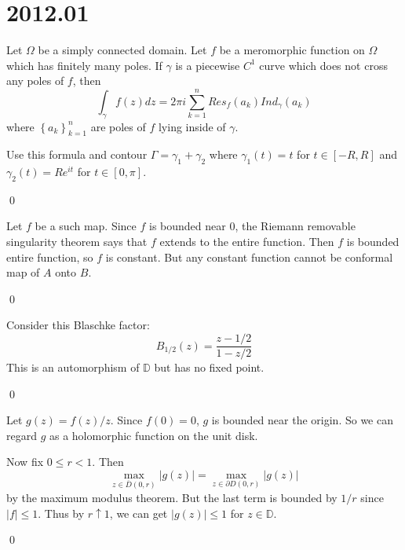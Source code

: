 \section{2012.01}

\begin{problem}
	
	Let $\Omega$ be a simply connected domain. Let $f$ be a meromorphic function on $\Omega$ which has finitely many poles.
	If $\gamma$ is a piecewise $C^1$ curve which does not cross any poles of $f$, then
	\[
		\int_\gamma f(z) dz = 2\pi i \sum_{k=1}^n Res_f(a_k) Ind_{\gamma}(a_k)
	\]
	where $\left\{ a_k \right\}_{k=1}^n$ are poles of $f$ lying inside of $\gamma$.

	Use this formula and contour $\Gamma = \gamma_1 + \gamma_2$ where $\gamma_1(t) = t$ for $t \in [-R, R]$ and $\gamma_2(t) = Re^{it}$ for $t \in [0, \pi]$.

	\qed
\end{problem}

\begin{problem}
	
	Let $f$ be a such map.
	Since $f$ is bounded near $0$, the Riemann removable singularity theorem says that $f$ extends to the entire function.
	Then $f$ is bounded entire function, so $f$ is constant.
	But any constant function cannot be conformal map of $A$ onto $B$.

	\qed
\end{problem}

\begin{problem}
	
	Consider this Blaschke factor:
	\[
		B_{1/2}(z) = \frac{z-1/2}{1-z/2}
	\]
	This is an automorphism of $\mathbb{D}$ but has no fixed point.

	\qed
\end{problem}

\begin{problem}
	
	Let $g(z) = f(z)/z$.
	Since $f(0) = 0$, $g$ is bounded near the origin.
	So we can regard $g$ as a holomorphic function on the unit disk.
	
	Now fix $0\leq r < 1$.
	Then
	\[
		\max_{z \in \overline{D}(0, r)} \lvert g(z) \lvert = \max_{z \in \partial D(0, r)}\lvert g(z) \lvert
	\]
	by the maximum modulus theorem.
	But the last term is bounded by $1/r$ since $|f| \leq 1$.
	Thus by $r \uparrow 1$, we can get $|g(z)| \leq 1$ for $z \in \mathbb{D}$.

	\qed
\end{problem}


